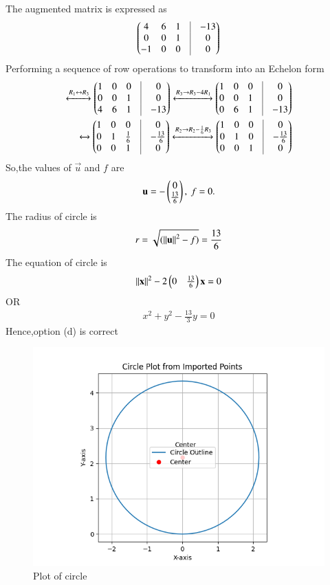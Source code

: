 \documentclass[journal]{IEEEtran}
\numberwithin{equation}{enumi}
\numberwithin{figure}{enumi}
\begin{document}
The augmented matrix is expressed as
\begin{align}
	\myvec{
	        4 & 6 & 1 & \vrule & -13\\
	       0 & 0 & 1 & \vrule & 0\\
-1 & 0 & 0 & \vrule & 0}
\end{align}
Performing a sequence of row operations to transform into an Echelon form
\begin{align*}
	\xleftrightarrow[]{{R_1\leftrightarrow R_3}}
	\myvec{1 & 0 & 0 & \vrule & 0\\
	        0 &  0 & 1 & \vrule & 0\\
	        4 & 6 & 1 & \vrule & -13}
	\xleftrightarrow[]{{R_3\rightarrow R_3-4R_1}}
	\myvec{1 & 0 & 0 & \vrule & 0\\
	        0 &  0 & 1 & \vrule & 0\\
	        0 &  6 & 1 & \vrule & -13}\\
	\xleftrightarrow[]{{}}
	\myvec{ 1 & 0 & 0 & \vrule & 0\\
	        0 &  1 & \frac{1}{6} & \vrule & -\frac{13}{6}\\
	        0 &  0 & 1 & \vrule & 0}	
	\xleftrightarrow[]{{R_2\rightarrow R_2-\frac{1}{6}R_3}}
	\myvec{ 1 &  0 & 0 & \vrule & 0\\
	        0 &  1 & 0 & \vrule & -\frac{13}{6}\\
	        0 &  0 & 1 & \vrule & 0}
\end{align*}
So,the values of $\vec{u}$ and $f$ are
\begin{align}
	\mathbf{u} = -\begin{pmatrix}0\\\frac{13}{6}\end{pmatrix},\
	f = 0.
\end{align}
The radius of circle is
\begin{align}
	r=\sqrt{(\left\lVert\mathbf{u}\right\rVert^2-f)}=\frac{13}{6}
\end{align}
The equation of circle is
\begin{align}
	\left\lVert\mathbf{x}\right\rVert^2-2\begin{pmatrix}0 & \frac{13}{6}\end{pmatrix}\mathbf{x}=0
\end{align}
OR
\begin{align}
x^2+y^2-\frac{13}{3}y=0
\end{align}
Hence,option (d) is correct
\begin{figure}[h!]
   \centering
   \includegraphics[width=0.7\linewidth]{figs/Figure_1.png}
   \caption{Plot of circle}
   \label{stemplot}
\end{figure}
\end{document}
